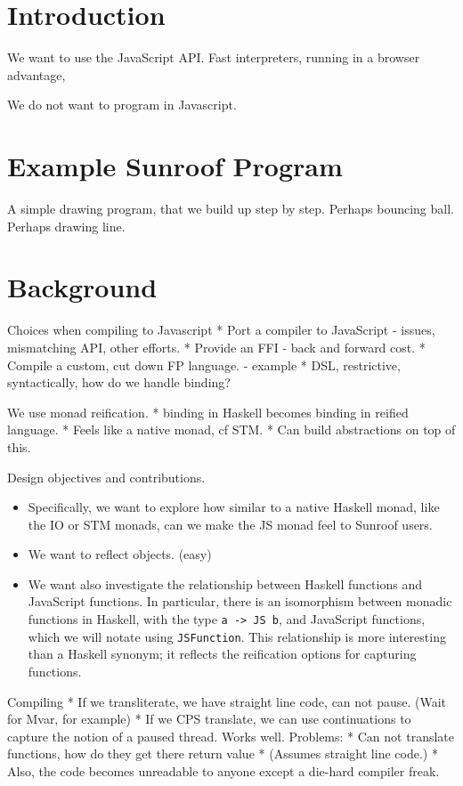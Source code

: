 \documentclass{llncs}
\begin{document}
\section{Introduction}

We want to use the JavaScript API. Fast interpreters,
running in a browser advantage, 

We do not want to program in Javascript.

\section{Example Sunroof Program}

A simple drawing program, that we build up step by step.
Perhaps bouncing ball.
Perhaps drawing line.

\section{Background}

Choices when compiling to Javascript
 * Port a compiler to JavaScript - issues, mismatching API, other efforts.
 * Provide an FFI - back and forward cost.
 * Compile a custom, cut down FP language. - example
 * DSL, restrictive, syntactically, how do we handle binding?

We use monad reification.
 * binding in Haskell becomes binding in reified language.
 * Feels like a native monad, cf STM.
 * Can build abstractions on top of this.

Design objectives and contributions.
\begin{itemize}
\item 
Specifically, we want to explore how similar to a native Haskell monad,
like the IO or STM monads, can we make the JS monad feel to Sunroof users.
\item We want to reflect objects. (easy)

\item We want also investigate the relationship between Haskell functions
and JavaScript functions. In particular, there is an isomorphism
between monadic functions in Haskell, with the type \verb|a -> JS b|,
and JavaScript functions, which we will notate using \verb|JSFunction|.
This relationship is more interesting than a Haskell synonym;
it reflects the reification options for capturing functions.
\end{itemize}

 
Compiling
 * If we transliterate, we have straight line code, can not pause.
    (Wait for Mvar, for example)
 * If we CPS translate, we can use continuations to capture the
   notion of a paused thread. Works well.
   Problems:
     * Can not translate functions, how do they get there return value
     * (Assumes straight line code.)
     * Also, the code becomes unreadable to anyone except a die-hard 
       compiler freak.
 
\end{document}
